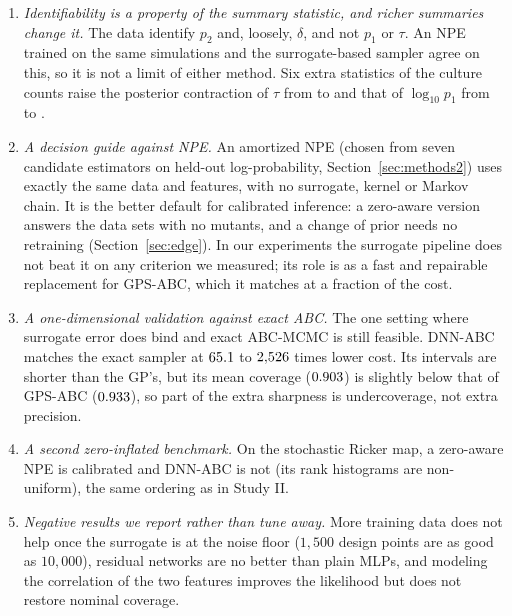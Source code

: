 \documentclass[sn-basic,iicol,pdflatex]{sn-jnl}
\begin{document}
\begin{enumerate}[label=(\roman*),leftmargin=*,itemsep=2pt,topsep=2pt]
truth is $1.000$ for any nearly unidentified parameter.
\item \emph{Identifiability is a property of the summary statistic, and richer summaries change it.} The data identify $p_2$ and, loosely, $\delta$, and not $p_1$ or $\tau$. An NPE trained on the same
simulations and the surrogate-based sampler agree on this, so it is not a limit of either method. Six extra statistics of the culture counts raise the posterior contraction of $\tau$ from \psevenBaseTauContraction{} to \psevenExtrasTauContraction{}
and that of $\log_{10}p_1$ from \psevenBaseLogPOneContraction{} to \psevenExtrasLogPOneContraction{}.
\item \emph{A decision guide against NPE.} An amortized NPE (chosen from seven candidate estimators on held-out log-probability, Section~\ref{sec:methods2}) uses exactly the same data and features, with no surrogate, kernel or Markov chain. It is the
better default for calibrated inference: a zero-aware version answers the data sets with no mutants, and a change of prior needs no retraining (Section~\ref{sec:edge}). In our experiments the surrogate pipeline does not beat it on any criterion we measured; its
role is as a fast and repairable replacement for GPS-ABC, which it matches at a fraction of the cost.
\item \emph{A one-dimensional validation against exact ABC.} The one setting where surrogate error
does bind and exact ABC-MCMC is still feasible. DNN-ABC matches the exact sampler at $65.1$ to $2{,}526$
times lower cost. Its intervals are shorter than the GP's, but its mean coverage ($0.903$) is slightly below that of GPS-ABC ($0.933$), so part of the extra sharpness is undercoverage, not extra precision.
\item \emph{A second zero-inflated benchmark.} On the stochastic Ricker map, a zero-aware NPE is calibrated and DNN-ABC is not (its rank histograms are non-uniform), the same ordering as in Study II.
\item \emph{Negative results we report rather than tune away.} More training
data does not help once the surrogate is at the noise floor ($1{,}500$ design points
are as good as $10{,}000$), residual networks are no better than plain MLPs, and
modeling the correlation of the two features improves the likelihood but does not
restore nominal coverage.
\end{enumerate}
\end{document}

